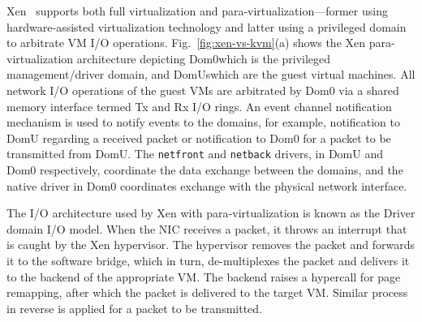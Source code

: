 Xen~\cite{xen-art-of-virtualization} supports both full virtualization and 
para-virtualization---former using hardware-assisted virtualization technology
and latter using a privileged domain to arbitrate VM I/O operations.
Fig.~\ref{fig:xen-vs-kvm}(a) shows the Xen 
para-virtualization architecture depicting 
Dom0\textemdash{}which 
is the privileged management/driver domain, and 
DomUs\textemdash{}which 
are the guest virtual machines. 
All network I/O operations
of the guest VMs are arbitrated by Dom0 via a shared memory interface
termed Tx and Rx I/O rings. 
An event channel notification mechanism is used to notify events
to the domains, for example, notification to DomU regarding a 
received packet or notification to Dom0 for a packet to be
transmitted from DomU.
The \texttt{netfront} 
and \texttt{netback} 
drivers, in DomU and Dom0 respectively,
coordinate the data exchange between the domains,
and the native driver in Dom0 coordinates exchange with
the physical network interface. 

The I/O architecture used by Xen with para-virtualization 
is known as the Driver domain I/O model. 
When the NIC receives a packet, it throws an interrupt that is caught by
the Xen hypervisor. The hypervisor removes the packet and forwards it
to the software bridge, which in turn, de-multiplexes the packet 
and delivers it to the backend of the appropriate VM. The backend
raises a hypercall for page remapping, after which the packet is 
delivered to the target VM. Similar process in reverse is applied
for a packet to be transmitted.

